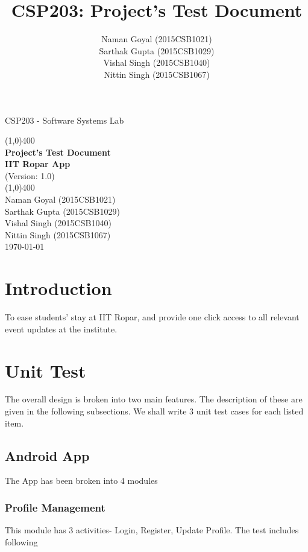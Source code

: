 \documentclass{article}
\title{CSP203: Project's Test Document}
\author{Naman Goyal (2015CSB1021) \\
Sarthak Gupta (2015CSB1029) \\
Vishal Singh (2015CSB1040) \\
Nittin Singh (2015CSB1067)
}
\begin{document}
\begin{titlepage}
\begin{center}
\vspace{1cm}
\Large{CSP203 - Software Systems Lab}
\vfill

\line(1,0){400}\\[1mm]
\huge{\textbf{Project's Test Document\\IIT Ropar App}}\\
\large{(Version: 1.0)}\\
\line(1,0){400}\\
\vfill
\Large{Naman Goyal (2015CSB1021) \\
Sarthak Gupta (2015CSB1029) \\
Vishal Singh (2015CSB1040) \\
Nittin Singh (2015CSB1067)
}\\

\vfill
\large{\today}\\
\end{center}
\end{titlepage}

\tableofcontents
\clearpage
\usetikzlibrary{positioning,shapes,shadows,arrows}

\newpage
\section{Introduction}
To ease students' stay at IIT Ropar, and provide one click access to all relevant event updates at the institute.
\section{Unit Test}
The overall design is broken into two main features. The description of these are given in the following subsections. We shall write 3 unit test cases for each listed item.
\subsection{Android App}
 The App has been broken into 4 modules

\subsubsection{Profile Management}
This module has 3 activities- Login, Register, Update Profile. The test includes following
\end{document}
